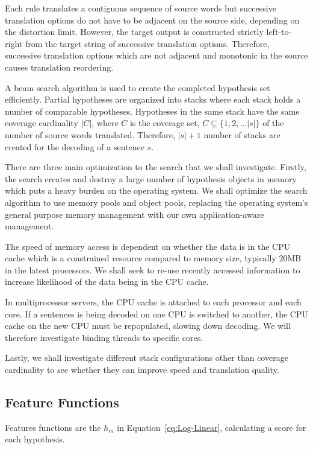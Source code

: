 \documentclass[11pt]{article}
\begin{document}
Each rule translates a contiguous sequence of source words but successive translation options do not have to be adjacent on the source side, depending on the distortion limit. However, the target output is constructed strictly left-to-right from the target string of successive translation options. Therefore, successive translation options which are not adjacent and monotonic in the source causes translation reordering.

A beam search algorithm is used to create the completed hypothesis set efficiently. Partial hypotheses are organized into stacks where each stack holds a number of comparable hypotheses. Hypotheses in the same stack have the same coverage cardinality $|C|$, where $C$ is  the coverage set, $C \subseteq \{1,2,... |s| \} $ of the number of  source words translated. Therefore, $|s| + 1$ number of stacks are created for the decoding of a sentence $s$. 

There are three main optimization to the search that we shall investigate. Firstly, the search creates and destroy a large number of hypothesis objects in memory which puts a heavy burden on the operating system. We shall optimize the search algorithm to use memory pools and object pools, replacing the operating system's general purpose memory management with our own application-aware management. 

The speed of memory access is dependent on whether the data is in the CPU cache which is a constrained resource compared to memory size, typically 20MB in the latest processors. We shall seek to re-use recently accessed information to increase likelihood of the data being in the CPU cache. 

In multiprocessor servers, the CPU cache is attached to each processor and each core. If a sentences is being decoded on one CPU is switched to another, the CPU cache on the new CPU must be repopulated, slowing down decoding. We will therefore investigate binding threads to specific cores.

Lastly, we shall investigate different stack configurations other than coverage cardinality to see whether they can improve speed and translation quality.

\subsection{Feature Functions}

Features functions are the $h_m$ in Equation~\ref{eq:Log-Linear}, calculating a score for each hypothesis.
\end{document}
